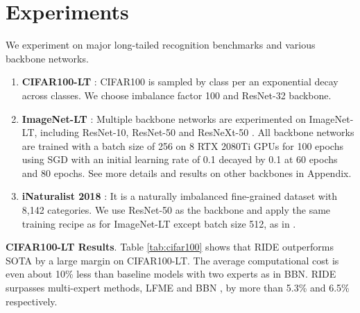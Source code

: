\def\figTsne#1{
\begin{figure}[#1]
    \centering
        \texttt{[image: figures/tsne\_all\_f.pdf]}\vspace{-4pt}
\caption{t-SNE visualization of LDAM's and our model's embedding space of CIFAR100-LT. The feature embedding of RIDE is more compact for both head and tail classes and better separated. This behavior greatly reduces the difficulty for the classifier to distinguish the tail category.}
    \label{fig:tsne_cifar100}
\end{figure}
}

\section{Experiments}
\label{experiments}

We experiment on major long-tailed recognition benchmarks and various backbone networks.
\begin{enumerate}[leftmargin=*,itemsep=0pt]
\item{\bf{CIFAR100-LT}} \citep{cao2019learning}: CIFAR100 is sampled by class per an exponential decay across classes.  We choose imbalance factor 100 and ResNet-32 \citep{he2016deep} backbone. 

\item{\bf{ImageNet-LT}} \citep{liu2019large}: Multiple backbone networks are experimented on ImageNet-LT, including ResNet-10, ResNet-50 and ResNeXt-50 \citep{xie2017aggregated}. All backbone networks are trained with a batch size of 256 on 8 RTX 2080Ti GPUs for 100 epochs using SGD with an initial learning rate of 0.1 decayed by 0.1 at 60 epochs and 80 epochs.
See more details and results on other backbones in Appendix.

\item{\bf{iNaturalist 2018}} \citep{van2018inaturalist}: It is a naturally imbalanced fine-grained dataset with 8,142 categories.
We use ResNet-50 as the backbone  and apply the same training recipe as for ImageNet-LT except batch size 512, as in \citep{kang2019decoupling}.
\end{enumerate}


{\bf{CIFAR100-LT Results}}. Table \ref{tab:cifar100} shows that RIDE outperforms SOTA by a large margin on CIFAR100-LT. The average computational cost is even about 10\% less than baseline models with two experts as in BBN.  RIDE surpasses multi-expert methods, LFME \citep{xiang2020learning} and BBN \citep{zhou2020bbn},
by more than 5.3\% and 6.5\% respectively. 

